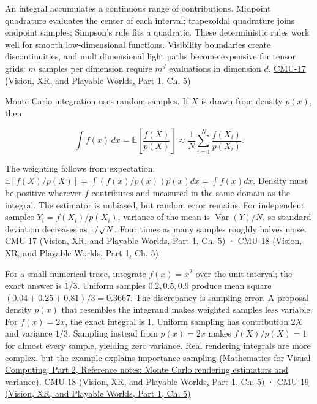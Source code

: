 An integral accumulates a continuous range of contributions. Midpoint quadrature evaluates the center of each interval; trapezoidal quadrature joins endpoint samples; Simpson's rule fits a quadratic. These deterministic rules work well for smooth low-dimensional functions. Visibility boundaries create discontinuities, and multidimensional light paths become expensive for tensor grids: \(m\) samples per dimension require \(m^d\) evaluations in dimension \(d\). \href{../07-Vision-XR-and-Playable-Worlds-P01/main.pdf\#04-visual-computing-ii-ch036-cmu-17---numerical-integration}{CMU-17 (Vision, XR, and Playable Worlds, Part 1, Ch. 5)}

Monte Carlo integration uses random samples. If \(X\) is drawn from density \(p(x)\), then

\[
\int f(x)\,dx=\mathbb E\left[\frac{f(X)}{p(X)}\right]\approx\frac1N\sum_{i=1}^N\frac{f(X_i)}{p(X_i)}.
\]

The weighting follows from expectation: \(\mathbb E[f(X)/p(X)]=\int (f(x)/p(x))p(x)dx=\int f(x)dx\). Density must be positive wherever \(f\) contributes and measured in the same domain as the integral. The estimator is unbiased, but random error remains. For independent samples \(Y_i=f(X_i)/p(X_i)\), variance of the mean is \(\operatorname{Var}(Y)/N\), so standard deviation decreases as \(1/\sqrt N\). Four times as many samples roughly halves noise. \href{../07-Vision-XR-and-Playable-Worlds-P01/main.pdf\#04-visual-computing-ii-ch036-cmu-17---numerical-integration}{CMU-17 (Vision, XR, and Playable Worlds, Part 1, Ch. 5)} · \href{../07-Vision-XR-and-Playable-Worlds-P01/main.pdf\#04-visual-computing-ii-ch036-cmu-18---monte-carlo-rendering}{CMU-18 (Vision, XR, and Playable Worlds, Part 1, Ch. 5)}

For a small numerical trace, integrate \(f(x)=x^2\) over the unit interval; the exact answer is \(1/3\). Uniform samples \(0.2,0.5,0.9\) produce mean square \((0.04+0.25+0.81)/3=0.3667\). The discrepancy is sampling error. A proposal density \(p(x)\) that resembles the integrand makes weighted samples less variable. For \(f(x)=2x\), the exact integral is 1. Uniform sampling has contribution \(2X\) and variance \(1/3\). Sampling instead from \(p(x)=2x\) makes \(f(X)/p(X)=1\) for almost every sample, yielding zero variance. Real rendering integrals are more complex, but the example explains \href{../02-Mathematics-for-Visual-Computing-P02/main.pdf\#appendix-031e02bf28af}{importance sampling (Mathematics for Visual Computing, Part 2, Reference notes: Monte Carlo rendering estimators and variance)}. \href{../07-Vision-XR-and-Playable-Worlds-P01/main.pdf\#04-visual-computing-ii-ch036-cmu-18---monte-carlo-rendering}{CMU-18 (Vision, XR, and Playable Worlds, Part 1, Ch. 5)} · \href{../07-Vision-XR-and-Playable-Worlds-P01/main.pdf\#04-visual-computing-ii-ch036-cmu-19---variance-reduction}{CMU-19 (Vision, XR, and Playable Worlds, Part 1, Ch. 5)}

